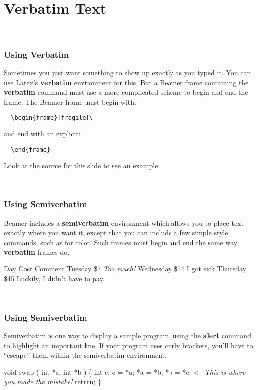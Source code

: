 \documentclass{beamer}
\begin{document}
  \section{Verbatim Text}
  \begin{frame}[fragile]\
  {
    \frametitle{Using Verbatim}

    Sometimes you just want something to show up exactly as you typed it.
    You can use Latex's {\bf{verbatim}} environment for this.  But a Beamer
    frame containing the {\bf{verbatim}} command must use a more complicated
    scheme to begin and end the frame.  The Beamer frame must begin with:
\begin{verbatim}
  \begin{frame}[fragile]\
\end{verbatim}
and end with an explicit:
\begin{verbatim}
  \end{frame}
\end{verbatim}
  Look at the source for this slide to see an example.
  }
\end{frame}
  \begin{frame}[fragile]\
  {
    \frametitle{Using Semiverbatim}

    Beamer includes a {\bf{semiverbatim}} environment which allows you to
    place text exactly where you want it, except that you can include a few
    simple style commands, such as for color.  Such frames must begin and end
    the same way {\bf{verbatim}} frames do.
\begin{semiverbatim}
  Day       Cost  Comment
  Tuesday   \$7   {\it{Too much!}}
  Wednesday \$14  {\tiny{I got sick}}
  Thursday  {\alert{\$45}}  Luckily, I didn't have to pay.
\end{semiverbatim}
  }
\end{frame}
  \begin{frame}[fragile]\
  {
    \frametitle{Using Semiverbatim}

    Semiverbatim is one way to display a sample program, using the
    {\bf{alert}} command to highlight an important line.   If your program
    uses curly brackets, you'll have to ``escape'' them within the
    semiverbatim environment.
\begin{tiny}
\begin{semiverbatim}
  void swap ( int *a, int *b )
  \{
    int c; 
    c = *a;  
    *a = *b;
    *b = {\alert{*c}};   <-- {\it{This is where you made the mistake!}}
    return;
  \} 
\end{semiverbatim}
\end{tiny}
  }
\end{frame}
\end{document}
